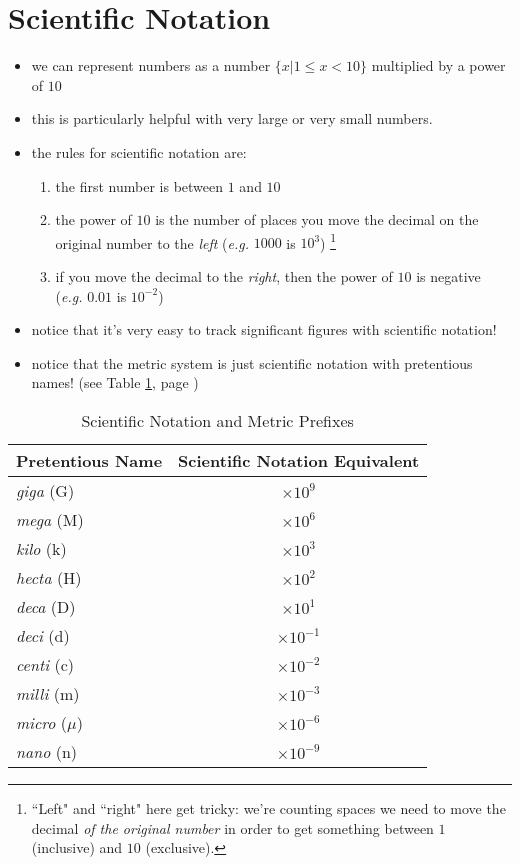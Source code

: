 \documentclass[11pt, oneside]{article}   	%
\begin{document}
\section{Scientific Notation}
\begin{itemize}
\item we can represent numbers as a number $\{ x | 1 \leq x < 10 \}$ multiplied by a power of $10$
\item this is particularly helpful with very large or very small numbers.
\item the rules for scientific notation are:
\begin{enumerate}
\item the first number is between $ 1 $ and $ 10 $
\item  the power of $ 10 $ is the number of places you move the decimal on the original number to the \emph{left} (\emph{e.g.} $1000$ is $10^{3}$)
\footnote{``Left" and ``right" here get tricky: we're counting spaces we need to move the decimal \emph{of the original number} in order to get something between $1$ (inclusive) and $10$ (exclusive).}
\item if you move the decimal to the \emph{right}, then the power of $ 10 $ is negative (\emph{e.g.} $0.01$ is $10^{-2}$)
\end{enumerate}
\item notice that it's very easy to track significant figures with scientific notation!
\item notice that the metric system is just scientific notation with pretentious names! (see Table \ref{table:pretentiousprefixes}, page \pageref{table:pretentiousprefixes})
 \end{itemize}

\begin{table}
\centering
\begin{tabular}[c]{l|c}
\hline
Pretentious Name & Scientific Notation Equivalent \\
\hline
\emph{giga} (G)  & $ \times 10^{9} $   \\
\emph{mega} (M)  & $ \times 10^{6} $   \\
\emph{kilo} (k)      & $ \times 10^{3} $   \\
\emph{hecta} (H)      & $ \times 10^{2} $   \\
\emph{deca} (D)      & $ \times 10^{1} $   \\
\emph{deci} (d)      & $ \times 10^{-1} $   \\
\emph{centi} (c)     & $ \times 10^{-2} $   \\
\emph{milli}  (m)    & $ \times 10^{-3} $  \\
\emph{micro} ($\mu$)  & $ \times 10^{-6} $  \\
\emph{nano}  (n) & $ \times 10^{-9} $  \\
\end{tabular}
\caption{Scientific Notation and Metric Prefixes}
\label{table:pretentiousprefixes}
\end{table}
\end{document}
